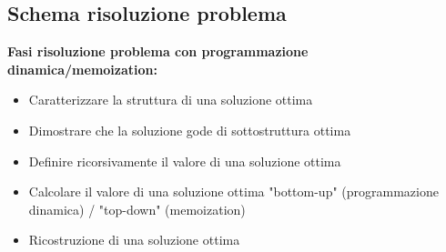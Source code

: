 \documentclass[../cheatSheetAlgoritmi.tex]{subfiles}
\begin{document}
\subsection{Schema risoluzione problema}
\textbf{Fasi risoluzione problema con programmazione dinamica/memoization:}\
\begin{itemize}
	\item Caratterizzare la struttura di una soluzione ottima
	\item Dimostrare che la soluzione gode di sottostruttura ottima
	\item Definire ricorsivamente il valore di una soluzione ottima
	\item Calcolare il valore di una soluzione ottima "bottom-up" (programmazione dinamica) / "top-down" (memoization)
	\item Ricostruzione di una soluzione ottima
\end{itemize}
\newpage
\end{document}
